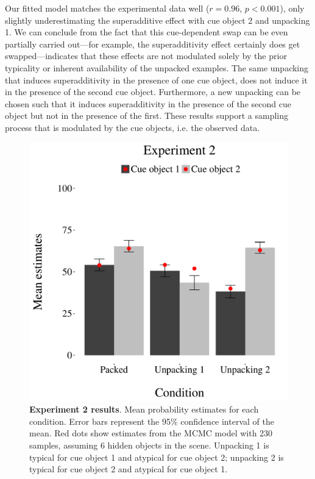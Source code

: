 
Our fitted model matches the experimental data well ($r=0.96$, $p<0.001$), only slightly underestimating the superadditive effect with cue object 2 and unpacking 1. We can conclude from the fact that this cue-dependent swap can be even partially carried out---for example, the superadditivity effect certainly does get swapped---indicates that these effects are not modulated solely by the prior typicality or inherent availability of the unpacked examples. The same unpacking that induces superadditivity in the presence of one cue object, does not induce it in the presence of the second cue object. Furthermore, a new unpacking can be chosen such that it induces superadditivity in the presence of the second cue object but not in the presence of the first. These results support a sampling process that is modulated by the cue objects, i.e. the observed data.

\begin{figure}
\centering
\includegraphics[scale=0.5]{figures/estimate2new.pdf}
\caption{\textbf{Experiment 2 results}. Mean probability estimates for each condition. Error bars represent the 95\% confidence interval of the mean. Red dots show estimates from the MCMC model with 230 samples, assuming 6 hidden objects in the scene. Unpacking 1 is typical for cue object 1 and atypical for cue object 2; unpacking 2 is typical for cue object 2 and atypical for cue object 1.}
\label{fig:results2}
\end{figure}

